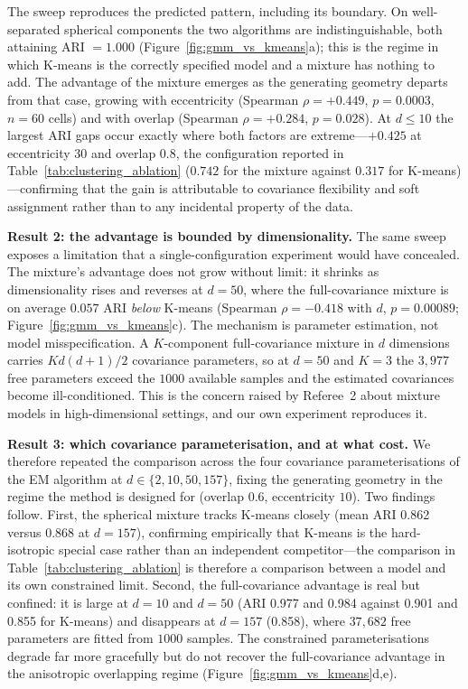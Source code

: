 \documentclass[lettersize,journal]{IEEEtran}
\begin{document}
		\noindent The sweep reproduces the predicted pattern, including its boundary. On well-separated spherical components the two algorithms are indistinguishable, both attaining ARI $= 1.000$ (Figure~\ref{fig:gmm_vs_kmeans}a); this is the regime in which K-means is the correctly specified model and a mixture has nothing to add. The advantage of the mixture emerges as the generating geometry departs from that case, growing with eccentricity (Spearman $\rho = +0.449$, $p = 0.0003$, $n = 60$ cells) and with overlap (Spearman $\rho = +0.284$, $p = 0.028$). At $d \leq 10$ the largest ARI gaps occur exactly where both factors are extreme---$+0.425$ at eccentricity $30$ and overlap $0.8$, the configuration reported in Table~\ref{tab:clustering_ablation} ($0.742$ for the mixture against $0.317$ for K-means)---confirming that the gain is attributable to covariance flexibility and soft assignment rather than to any incidental property of the data.
		
		\noindent \textbf{Result 2: the advantage is bounded by dimensionality.} The same sweep exposes a limitation that a single-configuration experiment would have concealed. The mixture's advantage does not grow without limit: it shrinks as dimensionality rises and reverses at $d = 50$, where the full-covariance mixture is on average $0.057$ ARI \emph{below} K-means (Spearman $\rho = -0.418$ with $d$, $p = 0.00089$; Figure~\ref{fig:gmm_vs_kmeans}c). The mechanism is parameter estimation, not model misspecification. A $K$-component full-covariance mixture in $d$ dimensions carries $Kd(d+1)/2$ covariance parameters, so at $d = 50$ and $K = 3$ the $3{,}977$ free parameters exceed the $1000$ available samples and the estimated covariances become ill-conditioned. This is the concern raised by Referee~2 about mixture models in high-dimensional settings, and our own experiment reproduces it.
		
		\noindent \textbf{Result 3: which covariance parameterisation, and at what cost.} We therefore repeated the comparison across the four covariance parameterisations of the EM algorithm at $d \in \{2, 10, 50, 157\}$, fixing the generating geometry in the regime the method is designed for (overlap $0.6$, eccentricity $10$). Two findings follow. First, the spherical mixture tracks K-means closely (mean ARI 0.862 versus 0.868 at $d=157$), confirming empirically that K-means is the hard-isotropic special case rather than an independent competitor---the comparison in Table~\ref{tab:clustering_ablation} is therefore a comparison between a model and its own constrained limit. Second, the full-covariance advantage is real but confined: it is large at $d = 10$ and $d = 50$ (ARI 0.977 and 0.984 against 0.901 and 0.855 for K-means) and disappears at $d = 157$ (0.858), where $37{,}682$ free parameters are fitted from $1000$ samples. The constrained parameterisations degrade far more gracefully but do not recover the full-covariance advantage in the anisotropic overlapping regime (Figure~\ref{fig:gmm_vs_kmeans}d,e).
		
\end{document}
